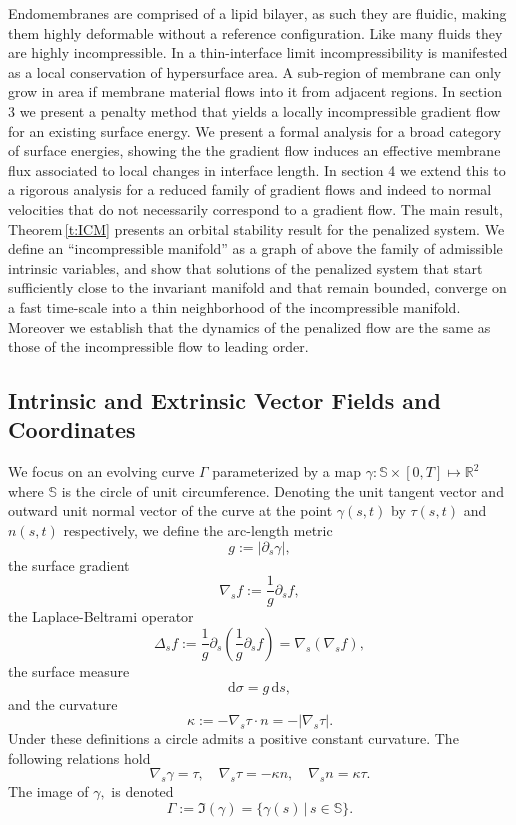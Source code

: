 \documentclass[11pt]{amsart}
\theoremstyle{plain}
\newcommand{\beq}{\begin{equation}}
\newcommand{\eeq}{\end{equation}}
\def\mbbS{\mathbb{S}}
\def\vtau{\tau}
\def\rmd{\mathrm d}
\numberwithin{equation}{section}
\theoremstyle{plain}
\begin{document}
Endomembranes are comprised of a lipid bilayer, as such they are fluidic, making them highly deformable without a reference configuration. Like many fluids they are highly incompressible. In a thin-interface limit incompressibility is manifested as a local conservation of hypersurface area. A sub-region of membrane can only grow in area if membrane material flows into it from adjacent regions. In section 3 we present a penalty method that yields a locally incompressible gradient flow for an existing surface energy. We present a formal analysis for a broad category of surface energies, showing the the gradient flow induces an effective membrane flux associated to local changes in interface length. In section 4 we extend this to a rigorous analysis for a reduced family of gradient flows and indeed to normal velocities that do not necessarily correspond to a gradient flow. The main result, Theorem\,\ref{t:ICM} presents an orbital stability result for the penalized system. We define an ``incompressible manifold'' as a graph of above the family of admissible intrinsic variables, and show that solutions of the penalized system that start sufficiently close to the invariant manifold and that remain bounded, converge on a fast time-scale into a thin neighborhood of the incompressible manifold. Moreover we establish that the dynamics of the penalized flow are the same as those of the incompressible flow to leading order.

\subsection{Intrinsic and Extrinsic Vector Fields and Coordinates}
We focus on an evolving curve $\Gamma$ parameterized by a map $\gamma:\mbbS\times[0,T]\mapsto{\mathbb R}^2$
where $\mbbS$ is the circle of unit circumference.  Denoting the unit tangent vector and outward unit normal vector of the curve at the point $\gamma(s,t)$ by $\tau(s,t)$ and $n(s,t)$ respectively, we define the arc-length metric
\beq\label {e:metric-def}
g:=|\partial_s\gamma|,
\eeq
the  surface gradient
$$ \nabla_s f:= \frac{1}{g}\partial_s f,$$
the Laplace-Beltrami operator
$$\Delta_s f :=  \frac{1}{g} \partial_s\left( \frac{1}{g}\partial_s f \right)=\nabla_s(\nabla_s f),$$
the surface measure
 $$\rmd\sigma=g\,\rmd s,$$
and the curvature
\[
\kappa:=-\nabla_s\vtau\cdot n=-|\nabla_s \vtau|.
\]
Under these definitions a circle admits a positive constant curvature. 
The following relations hold
\beq
\label{e:tau-n}
\nabla_s\gamma=\vtau, \quad \nabla_s\vtau=-\kappa n, \quad \nabla_s n=\kappa \vtau.
\eeq
The image of $\gamma,$ is denoted
$$\Gamma:=\Im(\gamma)=\{\gamma(s)\,\bigl|\, s\in\mbbS\}.$$
\end{document}
